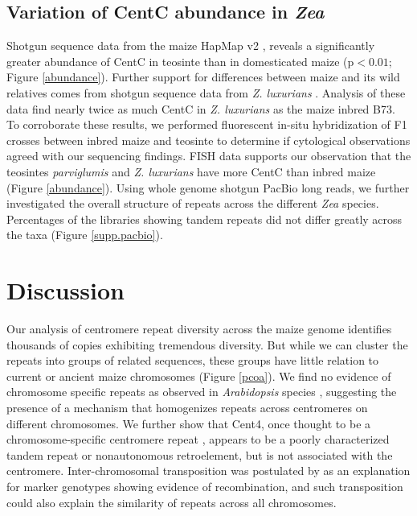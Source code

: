 \subsection*{Variation of CentC abundance in \emph{Zea}}

Shotgun sequence data from the maize HapMap v2 \citep{Chia2012}, reveals a significantly greater abundance of CentC in teosinte than in domesticated maize (p$<0.01$; Figure \ref{abundance}).   
Further support for differences between maize and its wild relatives comes from shotgun sequence data from \emph{Z. luxurians} \citep{Tenaillon2011}.  
Analysis of these data find nearly twice as much CentC in \emph{Z. luxurians} as the maize inbred B73.  
To corroborate these results, we performed fluorescent in-situ hybridization of F1 crosses between inbred maize and teosinte to determine if cytological observations agreed with our sequencing findings.   
FISH data supports our observation that the teosintes \emph{parviglumis} and \emph{Z. luxurians} have more CentC than inbred maize (Figure \ref{abundance}).  Using whole genome shotgun PacBio long reads, we further investigated the overall structure of repeats across the different \emph{Zea} species.  Percentages of the libraries showing tandem repeats did not differ greatly across the taxa (Figure \ref{supp.pacbio}).

\section*{Discussion}
\label{discussion}


Our analysis of centromere repeat diversity across the maize genome identifies thousands of copies exhibiting tremendous diversity. 
But while we can cluster the repeats into groups of related sequences, these groups have little relation to current or ancient maize chromosomes (Figure \ref{pcoa}).  
We find no evidence of chromosome specific repeats as observed in \emph{Arabidopsis} species \citep{Kawabe2005, Pontes2004}, suggesting the presence of a mechanism that homogenizes repeats across centromeres on different chromosomes. 
We further show that Cent4, once thought to be a chromosome-specific centromere repeat \citep{Page2001}, appears to be a poorly characterized tandem repeat or nonautonomous retroelement, but is not associated with the centromere.  
Inter-chromosomal transposition was postulated by \citet{Shi2010} as an explanation for marker genotypes showing evidence of recombination, and such transposition could also explain the similarity of repeats across all chromosomes. 

